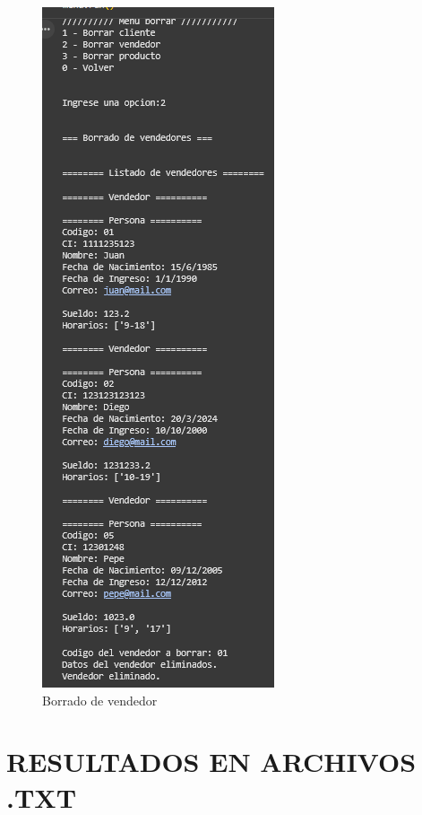 \documentclass[11pt]{article}
\begin{document}
\begin{multicols}{2}
\begin{figure}[H]
    \centering
    \includegraphics[width=0.5\linewidth]{./anexos/evidencias/eliminarVendedor.png}
    \caption{Borrado de vendedor}
    \label{fig:eliminarVendedor}
\end{figure}

\end{multicols}

\section{RESULTADOS EN ARCHIVOS .TXT}





\end{document}
